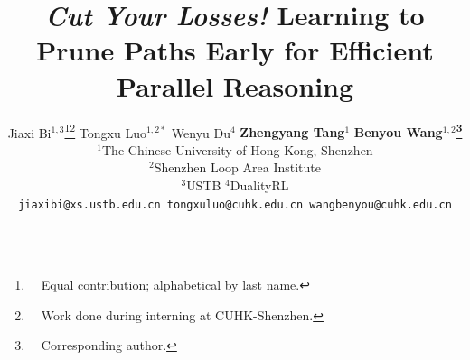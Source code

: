 \documentclass[11pt]{article}
\title{\textit{Cut Your Losses!} Learning to Prune Paths Early for Efficient Parallel Reasoning}
\author{
   Jiaxi Bi$^{1,3}$\thanks{~~Equal contribution; alphabetical by last name.}\thanks{~~Work done during interning at CUHK-Shenzhen.}
   \quad  Tongxu Luo$^{1,2*}$  
   \quad  Wenyu Du$^{4}$ 
   \quad  \textbf{Zhengyang Tang$^{1}$} 
   \quad \textbf{Benyou Wang$^{1,2}$\thanks{~~Corresponding author.}} \\
  $^{1}$The Chinese University of Hong Kong, Shenzhen \\
  $^{2}$Shenzhen Loop Area Institute \\
  $^{3}$USTB \quad
  $^{4}$DualityRL
  \\
  \texttt{jiaxibi@xs.ustb.edu.cn \quad tongxuluo@cuhk.edu.cn \quad wangbenyou@cuhk.edu.cn} 
}
\theoremstyle{plain}
\begin{document}
\maketitle
\begin{abstract}


\end{abstract}
\end{document}
